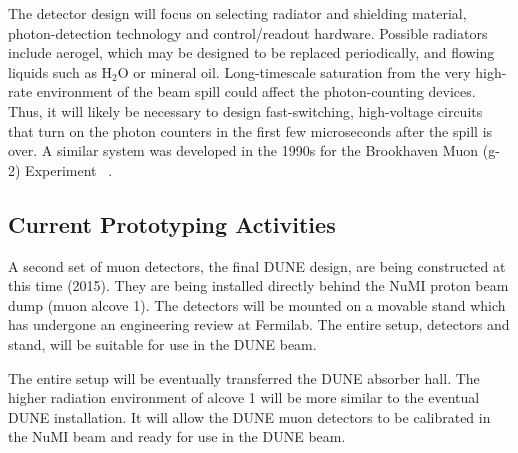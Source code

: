 The detector design will focus on selecting radiator and shielding
material, photon-detection technology and control/readout
hardware. Possible radiators include aerogel, which may be designed to
be replaced periodically, and flowing liquids such as H$_2$O or
mineral oil. Long-timescale saturation from the very high-rate
environment of the beam spill could affect the photon-counting
devices\cite{ref:HighRateCounting}. Thus, it will likely be necessary
to design fast-switching, high-voltage circuits that turn on the
photon counters in the first few microseconds after the spill is
over. A similar system was developed in the 1990s for the Brookhaven
Muon (g-2) Experiment~\cite{ref:G2} .

\subsection{Current Prototyping Activities}

A second set of muon detectors, the final DUNE design, are being
constructed at this time (2015). They are being installed directly
behind the NuMI proton beam dump (muon alcove 1). The detectors will
be mounted on a movable stand which has undergone an engineering
review at Fermilab. The entire setup, detectors and stand, will be
suitable for use in the DUNE beam.

The entire setup will be eventually transferred the DUNE absorber
hall. The higher radiation environment of alcove 1 will be more
similar to the eventual DUNE installation. It will allow the DUNE muon
detectors to be calibrated in the NuMI beam and ready for use in the
DUNE beam.
